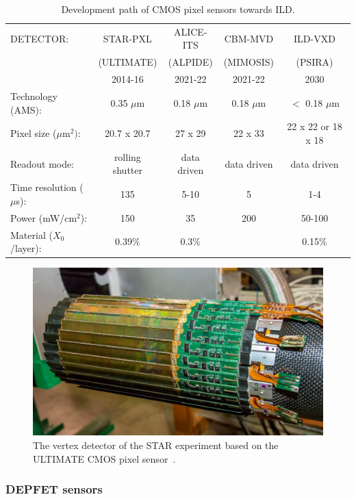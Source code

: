 \begin{table}\hspace*{-0cm}\small
\begin{tabular}{ l c c c c }
\toprule
DETECTOR: & STAR-PXL & ALICE-ITS & CBM-MVD & ILD-VXD \\
& (ULTIMATE) & (ALPIDE) & (MIMOSIS) & (PSIRA) \\
& 2014-16 & 2021-22 & 2021-22   & 2030 \\
\midrule
Technology (AMS): & 0.35 $\mu$m & 0.18 $\mu$m & 0.18 $\mu$m & $<$ 0.18 $\mu$m \\
Pixel size ($\mu$m$^2)$: & 20.7 x 20.7  & 27 x 29 & 22 x 33 & 22 x 22 or 18 x 18 \\
Readout mode:   & rolling shutter & data driven & data driven & data driven \\
Time resolution ($\mu$s):   & 135 & 5-10 & 5 & 1-4 \\
Power (mW/cm$^2$):   & 150 & 35  & 200  & 50-100 \\
Material ($X_0$/layer):   & 0.39\% & 0.3\%  &   & 0.15\% \\
\bottomrule
\end{tabular}
\caption{\label{ild:tab:CMOSdev}Development path of CMOS pixel sensors towards ILD.}
\end{table}



\begin{figure}[t!]
\centering
\includegraphics[width=0.6\hsize]{Detector/fig/VTX_STAR.png}
\caption{The vertex detector of the STAR experiment based on the ULTIMATE CMOS pixel sensor~\cite{Contin:2017mck}.}
\label{fig:det:VTX_STAR}
\end{figure}

\subsubsection{DEPFET sensors}

